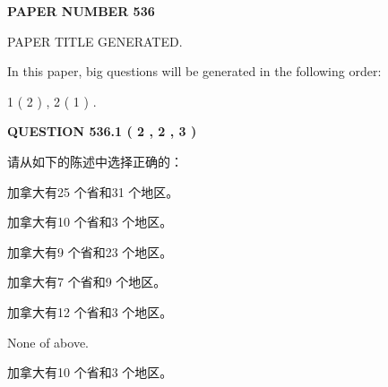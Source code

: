 \documentclass{ctexart}
\begin{document}
   
   
   
\newpage 
\setcounter{page}{ 
   536001 } 
   
   
   
   
 {\textbf{ \Large{ PAPER NUMBER  536  }}}
   
   
\vspace{0.2in}
   
   
   
   
   
   
   
   
 \vspace{0.2in}
 
 
 
 
   
   
 PAPER TITLE GENERATED.
   
   
   
\vspace{0.2in}
   
In this paper, big questions will be generated in the following order: 
   
   
   1 ( 2 )
 ,
   2 ( 1 )
 .
  
\vspace{0.2in}
  
{\textbf{\Large{QUESTION
536.1 
 ( 2 , 2 , 3 )
}}}
  
  
请从如下的陈述中选择正确的：
 
 
加拿大有25 个省和31 个地区。
 
 
加拿大有10 个省和3 个地区。
 
 
加拿大有9 个省和23 个地区。
 
 
加拿大有7 个省和9 个地区。
 
 
加拿大有12 个省和3 个地区。
 
 
 None of above.
 
 
\noindent{}
 
 
加拿大有10 个省和3 个地区。
 
 
\noindent{}
 
 
   
   
   
\end{document}
